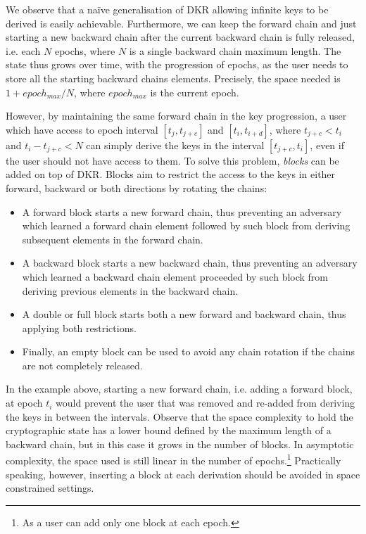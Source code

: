 We observe that a na\"ive generalisation of DKR allowing
infinite keys to be derived is easily achievable. Furthermore, we can keep the 
forward chain and just starting a new backward chain after the 
current backward chain is fully released,
i.e. each $N$ epochs, where $N$ is a single backward chain maximum length.
The state thus grows over time, with the progression of epochs, as the 
user needs to store all the starting backward chains elements. 
Precisely, the space needed is $1 + epoch_{max} / N$, 
where $epoch_{max}$ is the current epoch.

However, by maintaining the same forward chain in the key progression,
a user which have access to epoch interval 
$[t_j, t_{j + c}]$ and $[t_i, t_{i + d}]$, 
where $t_{j + c} < t_i$ and $t_i - t_{j + c} < N$  
can simply derive the keys in the interval $[t_{j + c}, t_i]$, even if 
the user should not have access to them.
To solve this problem, \textit{blocks} can be added on top of DKR.
Blocks aim to restrict the access to the keys in either forward, backward
or both directions by rotating the chains:
\begin{itemize}
    \item A forward block starts a new forward chain, thus preventing an adversary which learned a forward chain element followed by such block from deriving subsequent elements in the forward chain. 
    \item A backward block starts a new backward chain, thus preventing an adversary which learned a backward chain element proceeded by such block from deriving previous elements in the backward chain.
    \item A double or full block starts both a new forward and backward chain, thus applying both restrictions.
    \item Finally, an empty block can be used to avoid any chain rotation if the chains are not completely released.
\end{itemize} 
In the example above, starting a new forward chain, i.e. adding a forward block,
at epoch $t_i$ would prevent the user that was removed and re-added from deriving the keys in between 
the intervals. Observe that the space complexity to hold the cryptographic
state has a lower bound defined by the maximum length of a backward chain,
but in this case it grows in the number of blocks. In asymptotic
complexity, the space used is still linear in the number of epochs.\footnote{As a user can add only one block at each epoch.}
Practically speaking, however, inserting a block at each derivation
should be avoided in space constrained settings. 

